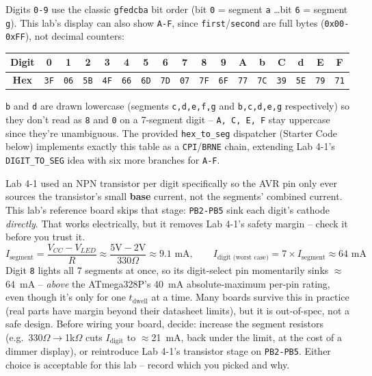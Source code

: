\documentclass[11pt]{article}
\begin{document}
\begin{summary}
Digits \texttt{0-9} use the classic \texttt{gfedcba} bit order (bit \texttt{0} =
segment \texttt{a} \ldots bit \texttt{6} = segment \texttt{g}). This lab's
display can also show \texttt{A-F}, since \texttt{first}/\texttt{second} are full
bytes (\texttt{0x00-0xFF}), not decimal counters:
\begin{center}
\begin{tabular}{@{}ccccccccccccccccc@{}}
\toprule
\textbf{Digit} & 0 & 1 & 2 & 3 & 4 & 5 & 6 & 7 & 8 & 9 & A & b & C & d & E & F \\
\midrule
\textbf{Hex} & \texttt{3F} & \texttt{06} & \texttt{5B} & \texttt{4F} & \texttt{66}
& \texttt{6D} & \texttt{7D} & \texttt{07} & \texttt{7F} & \texttt{6F} &
\texttt{77} & \texttt{7C} & \texttt{39} & \texttt{5E} & \texttt{79} & \texttt{71} \\
\bottomrule
\end{tabular}
\end{center}
\texttt{b} and \texttt{d} are drawn lowercase (segments \texttt{c,d,e,f,g} and
\texttt{b,c,d,e,g} respectively) so they don't read as \texttt{8} and \texttt{0}
on a 7-segment digit -- \texttt{A, C, E, F} stay uppercase since they're
unambiguous. The provided \texttt{hex\_to\_seg} dispatcher (Starter Code below)
implements exactly this table as a \texttt{CPI}/\texttt{BRNE} chain, extending
Lab 4-1's \texttt{DIGIT\_TO\_SEG} idea with six more branches for \texttt{A-F}.
\end{summary}

\begin{summary}
Lab 4-1 used an NPN transistor per digit specifically so the AVR pin only ever
sources the transistor's small \textbf{base} current, not the segments'
combined current. This lab's reference board skips that stage: \texttt{PB2-PB5}
sink each digit's cathode \emph{directly}. That works electrically, but it
removes Lab 4-1's safety margin -- check it before you trust it.
\[
I_{\text{segment}} = \frac{V_{CC} - V_{LED}}{R} \approx \frac{5\text{V} -
2\text{V}}{330\Omega} \approx 9.1\text{ mA}, \qquad
I_{\text{digit (worst case)}} = 7 \times I_{\text{segment}} \approx 64\text{ mA}
\]
Digit \texttt{8} lights all 7 segments at once, so its digit-select pin
momentarily sinks $\approx$64~mA -- \emph{above} the ATmega328P's 40~mA
absolute-maximum per-pin rating, even though it's only for one
$t_{\text{dwell}}$ at a time. Many boards survive this in practice (real parts
have margin beyond their datasheet limits), but it is out-of-spec, not a safe
design. Before wiring your board, decide: increase the segment resistors
(e.g.\ 330$\Omega\to$1k$\Omega$ cuts $I_{\text{digit}}$ to $\approx$21~mA, back
under the limit, at the cost of a dimmer display), or reintroduce Lab 4-1's
transistor stage on \texttt{PB2-PB5}. Either choice is acceptable for this lab
-- record which you picked and why.
\end{summary}
\end{document}
